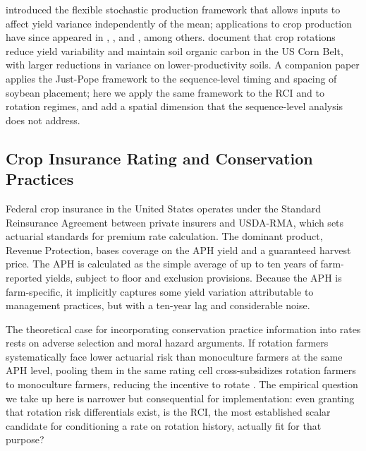 \documentclass[12pt,letterpaper]{article}
\theoremstyle{remark}
\theoremstyle{remark}
\theoremstyle{plain}
\theoremstyle{definition}
\begin{document}
\citet{Just1979} introduced the flexible stochastic production framework that allows inputs to affect yield variance independently of the mean; applications to crop production have since appeared in \citet{antle1983}, \citet{shi2013}, and \citet{li2021}, among others. \citet{wu2025} document that crop rotations reduce yield variability and maintain soil organic carbon in the US Corn Belt, with larger reductions in variance on lower-productivity soils. A companion paper applies the Just-Pope framework to the sequence-level timing and spacing of soybean placement; here we apply the same framework to the RCI and to rotation regimes, and add a spatial dimension that the sequence-level analysis does not address.

\subsection{\label{subsec:insurance_rating} Crop Insurance Rating and Conservation Practices}

Federal crop insurance in the United States operates under the Standard Reinsurance Agreement between private insurers and USDA-RMA, which sets actuarial standards for premium rate calculation. The dominant product, Revenue Protection, bases coverage on the APH yield and a guaranteed harvest price. The APH is calculated as the simple average of up to ten years of farm-reported yields, subject to floor and exclusion provisions. Because the APH is farm-specific, it implicitly captures some yield variation attributable to management practices, but with a ten-year lag and considerable noise.

The theoretical case for incorporating conservation practice information into rates rests on adverse selection and moral hazard arguments. If rotation farmers systematically face lower actuarial risk than monoculture farmers at the same APH level, pooling them in the same rating cell cross-subsidizes rotation farmers to monoculture farmers, reducing the incentive to rotate \citep{Ramaswami1993, Babcock1996}. The empirical question we take up here is narrower but consequential for implementation: even granting that rotation risk differentials exist, is the RCI, the most established scalar candidate for conditioning a rate on rotation history, actually fit for that purpose?
\end{document}
